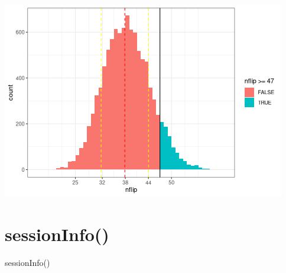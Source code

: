 \documentclass[
  10pt,
]{article}
\newenvironment{Shaded}{\begin{snugshade}}{\end{snugshade}}
\newcommand{\FunctionTok}[1]{\textcolor[rgb]{0.00,0.00,0.00}{#1}}
\newcommand{\NormalTok}[1]{#1}
\begin{document}
\includegraphics{05.pvalues_files/figure-latex/unnamed-chunk-9-1.png}

\newpage

\hypertarget{sessioninfo}{%
\section{sessionInfo()}\label{sessioninfo}}

\begin{Shaded}
\begin{Highlighting}[]
\FunctionTok{sessionInfo}\NormalTok{()}
\end{Highlighting}
\end{Shaded}
\end{document}
